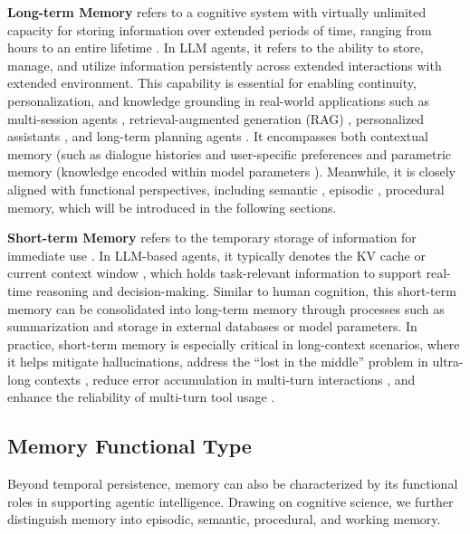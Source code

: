\documentclass[manuscript,screen]{acmart}
\newcommand{\zhaowei}[1]{\textcolor{cyan}{[ZW: #1]}}
\begin{document}
\textbf{Long-term Memory} refers to a cognitive system with virtually unlimited capacity for storing information over extended periods of time, ranging from hours to an entire lifetime \citep{sumers2024cognitive}. In LLM agents, it refers to the ability to store, manage, and utilize information persistently across extended interactions with extended environment. This capability is essential for enabling continuity, personalization, and knowledge grounding in real-world applications such as multi-session agents \citep{ge2025tremu}, retrieval-augmented generation (RAG) \citep{qian2024memorag}, personalized assistants \citep{du2024perltqa, zhong2024memorybank}, and long-term planning agents \citep{xu2025mem}. It encompasses both contextual memory (such as dialogue histories \citep{hu2025evaluating} and user-specific preferences \citep{zhang-etal-2024-llm-based, memobase2025} and parametric memory (knowledge encoded within model parameters \citep{cao2025memory}). Meanwhile, it is closely aligned with functional perspectives, including semantic \citep{wang2024symbolic}, episodic \citep{wang2025episodic, liu2025echo}, procedural \citep{fang2025memp} memory, which will be introduced in the following sections.

\textbf{Short-term Memory} refers to the temporary storage of information for immediate use \citep{lumer2025memtool}. In LLM-based agents, it typically denotes the KV cache \citep{yang2024memory3} or current context window \citep{packer2023memgpt}, which holds task-relevant information to support real-time reasoning and decision-making. Similar to human cognition, this short-term memory can be consolidated into long-term memory through processes such as summarization \citep{lu2023memochat} and storage in external databases or model parameters. In practice, short-term memory is especially critical in long-context scenarios, where it helps mitigate hallucinations, address the “lost in the middle” problem \citep{liu-etal-2024-lost} in ultra-long contexts \citep{yu2025memagent}, reduce error accumulation in multi-turn interactions \citep{zhou2025mem1}, and enhance the reliability of multi-turn tool usage \citep{lumer2025memtool}.

\subsection{Memory Functional Type}
Beyond temporal persistence, memory can also be characterized by its functional roles in supporting agentic intelligence. Drawing on cognitive science, we further distinguish memory into episodic, semantic, procedural, and working memory.
\end{document}
